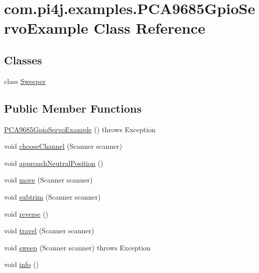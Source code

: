 \hypertarget{classcom_1_1pi4j_1_1examples_1_1PCA9685GpioServoExample}{}\section{com.\+pi4j.\+examples.\+P\+C\+A9685\+Gpio\+Servo\+Example Class Reference}
\label{classcom_1_1pi4j_1_1examples_1_1PCA9685GpioServoExample}
\subsection*{Classes}
\begin{DoxyCompactItemize}
\item 
class \hyperlink{classcom_1_1pi4j_1_1examples_1_1PCA9685GpioServoExample_1_1Sweeper}{Sweeper}
\end{DoxyCompactItemize}
\subsection*{Public Member Functions}
\begin{DoxyCompactItemize}
\item 
\hyperlink{classcom_1_1pi4j_1_1examples_1_1PCA9685GpioServoExample_a99aa7892d5f023a93e3a2422290f940d}{P\+C\+A9685\+Gpio\+Servo\+Example} ()  throws Exception 
\item 
void \hyperlink{classcom_1_1pi4j_1_1examples_1_1PCA9685GpioServoExample_a63c987174d35daa7114880d34e771c92}{choose\+Channel} (Scanner scanner)
\item 
void \hyperlink{classcom_1_1pi4j_1_1examples_1_1PCA9685GpioServoExample_a75c54f98d9c1bd05dabb02127c20e25b}{approach\+Neutral\+Position} ()
\item 
void \hyperlink{classcom_1_1pi4j_1_1examples_1_1PCA9685GpioServoExample_aa6857b9a79e7b4b90d80881daad1b2b3}{move} (Scanner scanner)
\item 
void \hyperlink{classcom_1_1pi4j_1_1examples_1_1PCA9685GpioServoExample_a1c4279be62b00596e1ccfef64101cf89}{subtrim} (Scanner scanner)
\item 
void \hyperlink{classcom_1_1pi4j_1_1examples_1_1PCA9685GpioServoExample_ae21ae5430e16b61cc27bcc500559152f}{reverse} ()
\item 
void \hyperlink{classcom_1_1pi4j_1_1examples_1_1PCA9685GpioServoExample_a39f2c682a3cd835ff25f324f610cbc9c}{travel} (Scanner scanner)
\item 
void \hyperlink{classcom_1_1pi4j_1_1examples_1_1PCA9685GpioServoExample_a717464e57d261c2a9b56129e348bf72c}{sweep} (Scanner scanner)  throws Exception 
\item 
void \hyperlink{classcom_1_1pi4j_1_1examples_1_1PCA9685GpioServoExample_ae81a5da56bd9525a26f8681df4a5c4df}{info} ()
\end{DoxyCompactItemize}
